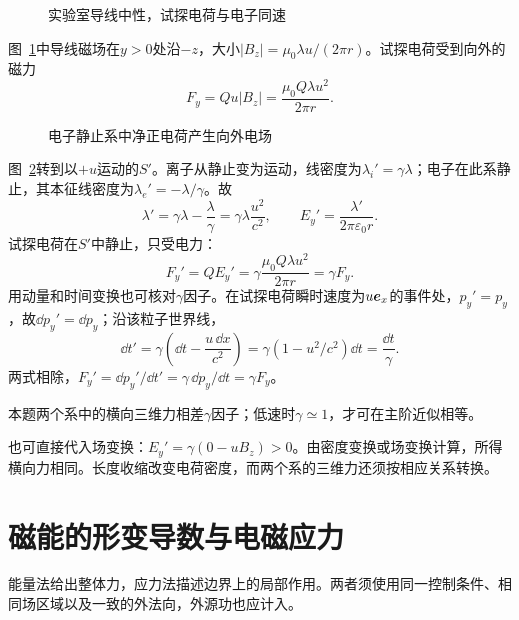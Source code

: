 \begin{figure}[H]\centering
{}
\caption{实验室导线中性，试探电荷与电子同速}\label{fig:i4-e6-q}
\end{figure}
\begin{solution}
图~\ref{fig:i4-e6-q}中导线磁场在$y>0$处沿$-z$，大小$|B_z|=\mu_0\lambda u/(2\pi r)$。试探电荷受到向外的磁力
\[
F_y=Qu|B_z|=\frac{\mu_0Q\lambda u^2}{2\pi r}.
\]

\begin{figure}[H]\centering
{}
\caption{电子静止系中净正电荷产生向外电场}\label{fig:i4-e6-s}
\end{figure}

图~\ref{fig:i4-e6-s}转到以$+u$运动的$S'$。离子从静止变为运动，线密度为$\lambda_i'=\gamma\lambda$；电子在此系静止，其本征线密度为$\lambda_e'=-\lambda/\gamma$。故
\[
\lambda'=\gamma\lambda-\frac{\lambda}{\gamma}
=\gamma\lambda\frac{u^2}{c^2},\qquad
E_y'=\frac{\lambda'}{2\pi\varepsilon_0r}.
\]
试探电荷在$S'$中静止，只受电力：
\[
F_y'=QE_y'
=\gamma\frac{\mu_0Q\lambda u^2}{2\pi r}
=\boxed{\gamma F_y}.
\]
用动量和时间变换也可核对$\gamma$因子。在试探电荷瞬时速度为$u\bm{e}_x$的事件处，$p_y'=p_y$，故$\dd p_y'=\dd p_y$；沿该粒子世界线，
\[
\dd t'=\gamma\left(\dd t-\frac{u\,\dd x}{c^2}\right)
=\gamma(1-u^2/c^2)\dd t=\frac{\dd t}{\gamma}.
\]
两式相除，$F_y'=\dd p_y'/\dd t'=\gamma\,\dd p_y/\dd t=\gamma F_y$。

本题两个系中的横向三维力相差$\gamma$因子；低速时$\gamma\simeq1$，才可在主阶近似相等。

也可直接代入场变换：$E_y'=\gamma(0-uB_z)>0$。由密度变换或场变换计算，所得横向力相同。长度收缩改变电荷密度，而两个系的三维力还须按相应关系转换。
\end{solution}


\section{磁能的形变导数与电磁应力}\label{sec:i4-stress}
能量法给出整体力，应力法描述边界上的局部作用。两者须使用同一控制条件、相同场区域以及一致的外法向，外源功也应计入。

